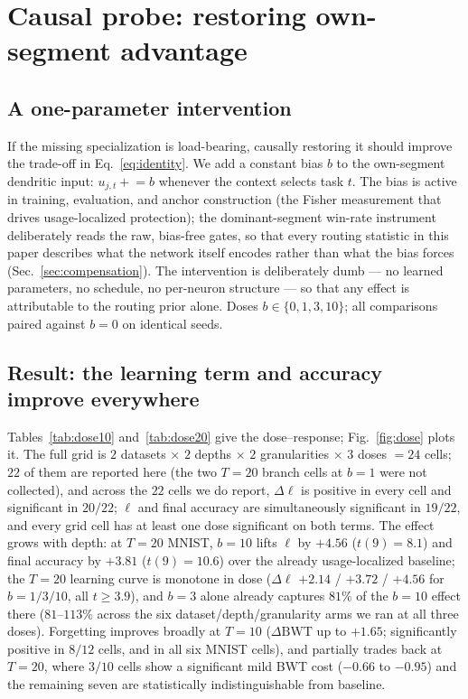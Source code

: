 \documentclass[review,12pt,number]{elsarticle}
\begin{document}
\section{Causal probe: restoring own-segment advantage}
\label{sec:causal}

\subsection{A one-parameter intervention}

If the missing specialization is load-bearing, causally restoring it should
improve the trade-off in Eq.~\eqref{eq:identity}. We add a constant bias $b$
to the own-segment dendritic input: $u_{j,t} \mathrel{+}= b$ whenever the
context selects task $t$. The bias is active in training, evaluation, and
anchor construction (the Fisher measurement that drives usage-localized
protection); the dominant-segment win-rate instrument deliberately reads
the raw, bias-free gates, so that every routing statistic in this paper
describes what the network itself encodes rather than what the bias
forces (Sec.~\ref{sec:compensation}). The intervention is deliberately
dumb --- no learned parameters, no schedule, no per-neuron structure ---
so that any effect is attributable to the routing prior alone. Doses
$b \in \{0, 1, 3, 10\}$; all comparisons paired against $b{=}0$ on
identical seeds.

\subsection{Result: the learning term and accuracy improve everywhere}

Tables~\ref{tab:dose10} and~\ref{tab:dose20} give the dose--response;
Fig.~\ref{fig:dose} plots it. The full grid is
$2$ datasets $\times$ $2$ depths $\times$ $2$ granularities $\times$
$3$ doses $=24$ cells; $22$ of them are reported here (the two
$T{=}20$ branch cells at $b{=}1$ were not collected), and across the $22$
cells we do report, $\Delta\ell$ is positive in every cell and
significant in $20/22$; $\ell$ and final accuracy are simultaneously
significant in $19/22$, and every grid cell has at least one dose
significant on both terms. The effect grows with depth: at $T{=}20$ MNIST,
$b{=}10$ lifts $\ell$ by $+4.56$ ($t(9){=}8.1$) and final accuracy by
$+3.81$ ($t(9){=}10.6$) over the already usage-localized baseline; the
$T{=}20$ learning curve is monotone in dose
($\Delta\ell$ $+2.14$ / $+3.72$ / $+4.56$ for $b{=}1/3/10$, all
$t \ge 3.9$), and $b{=}3$ alone already captures $81\%$ of the
$b{=}10$ effect there ($81$--$113\%$ across the six dataset/depth/granularity
arms we ran at all three doses). Forgetting
improves broadly at $T{=}10$ ($\Delta\mathrm{BWT}$ up to $+1.65$;
significantly positive in $8/12$ cells, and in all six MNIST cells), and
partially trades back at $T{=}20$, where $3/10$ cells show a significant
mild BWT cost ($-0.66$ to $-0.95$) and the remaining seven are
statistically indistinguishable from baseline.
\end{document}
